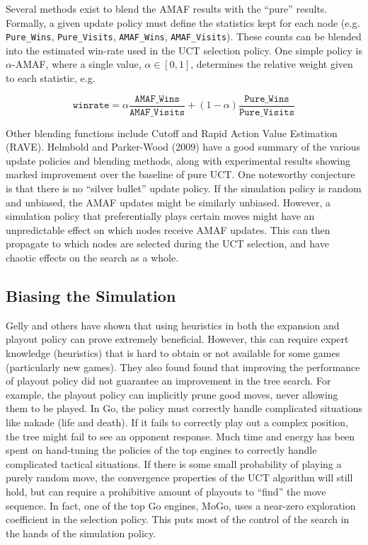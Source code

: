 \documentclass[11pt]{report}
\begin{document}
Several methods exist to blend the AMAF results with the ``pure'' results. Formally, a given update policy must define the statistics kept for each node (e.g. \texttt{Pure\_Wins}, \texttt{Pure\_Visits}, \texttt{AMAF\_Wins}, \texttt{AMAF\_Visits}). These counts can be blended into the estimated win-rate used in the UCT selection policy. One simple policy is $\alpha$-AMAF, where a single value, $\alpha \in [0, 1]$, determines the relative weight given to each statistic, e.g.

\[
\texttt{winrate} = \alpha\frac{\texttt{AMAF\_Wins}}{\texttt{AMAF\_Visits}} + (1 - \alpha)\frac{\texttt{Pure\_Wins}}{\texttt{Pure\_Visits}}
\]

Other blending functions include Cutoff and Rapid Action Value Estimation (RAVE)\cite{chaslot2008progressive}. Helmbold and Parker-Wood (2009) have a good summary of the various update policies and blending methods, along with experimental results showing marked improvement over the baseline of pure UCT\cite{helmbold2009all}. One noteworthy conjecture is that there is no ``silver bullet'' update policy. If the simulation policy is random and unbiased, the AMAF updates might be similarly unbiased. However, a simulation policy that preferentially plays certain moves might have an unpredictable effect on which nodes receive AMAF updates. This can then propagate to which nodes are selected during the UCT selection, and have chaotic effects on the search as a whole. 

\subsection{Biasing the Simulation}\label{bias}
Gelly and others have shown that using heuristics in both the expansion and playout policy can prove extremely beneficial\cite{gelly2006modification}\cite{gelly2008achieving}. However, this can require expert knowledge (heuristics) that is hard to obtain or not available for some games (particularly new games). They also found found that improving the performance of playout policy did not guarantee an improvement in the tree search. For example, the playout policy can implicitly prune good moves, never allowing them to be played. In Go, the policy must correctly handle complicated situations like nakade (life and death). If it fails to correctly play out a complex position, the tree might fail to see an opponent response. Much time and energy has been spent on hand-tuning the policies of the top engines to correctly handle complicated tactical situations. If there is some small probability of playing a purely random move, the convergence properties of the UCT algorithm will still hold, but can require a prohibitive amount of playouts to ``find'' the move sequence. In fact, one of the top Go engines, MoGo, uses a near-zero exploration coefficient in the selection policy\cite{gelly2007combining}. This puts most of the control of the search in the hands of the simulation policy.
\end{document}
